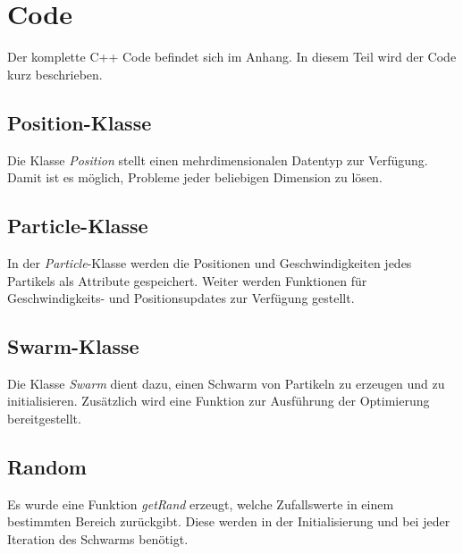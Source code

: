 \section{Code}
Der komplette C++ Code befindet sich im Anhang. In diesem Teil wird der Code kurz beschrieben.

\subsection{Position-Klasse}
Die Klasse \textit{Position} stellt einen mehrdimensionalen Datentyp zur Verfügung. 
Damit ist es möglich, Probleme jeder beliebigen Dimension zu lösen.

\subsection{Particle-Klasse}
In der \textit{Particle}-Klasse werden die Positionen und Geschwindigkeiten jedes Partikels
als Attribute gespeichert. Weiter werden Funktionen für Geschwindigkeits- und Positionsupdates
zur Verfügung gestellt.

\subsection{Swarm-Klasse}
Die Klasse \textit{Swarm} dient dazu, einen Schwarm von Partikeln zu erzeugen und zu initialisieren.
Zusätzlich wird eine Funktion zur Ausführung der Optimierung bereitgestellt.

\subsection{Random}
Es wurde eine Funktion \textit{getRand} erzeugt, welche Zufallswerte in einem bestimmten Bereich zurückgibt. Diese werden in der Initialisierung und bei jeder Iteration des Schwarms benötigt. 